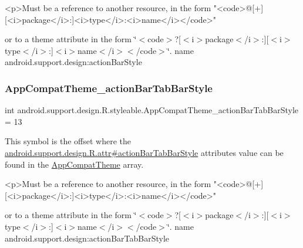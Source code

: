 \begin{DoxyVerb}      <p>Must be a reference to another resource, in the form "<code>@[+][<i>package</i>:]<i>type</i>:<i>name</i></code>"
\end{DoxyVerb}
 or to a theme attribute in the form \char`\"{}$<$code$>$?\mbox{[}$<$i$>$package$<$/i$>$\+:\mbox{]}\mbox{[}$<$i$>$type$<$/i$>$\+:\mbox{]}$<$i$>$name$<$/i$>$$<$/code$>$\char`\"{}.  name android.\+support.\+design\+:action\+Bar\+Style \mbox{\label{classandroid_1_1support_1_1design_1_1R_1_1styleable_ab0c563d507ebb2630a4566f31cf6f123}} 
\subsubsection{\texorpdfstring{App\+Compat\+Theme\+\_\+action\+Bar\+Tab\+Bar\+Style}{AppCompatTheme\_actionBarTabBarStyle}}
{\footnotesize\ttfamily int android.\+support.\+design.\+R.\+styleable.\+App\+Compat\+Theme\+\_\+action\+Bar\+Tab\+Bar\+Style = 13\hspace{0.3cm}{\ttfamily [static]}}

This symbol is the offset where the \hyperlink{classandroid_1_1support_1_1design_1_1R_1_1attr_a6ffaafec7b48bf979a12acf37ddeac31}{android.\+support.\+design.\+R.\+attr\#action\+Bar\+Tab\+Bar\+Style} attribute\textquotesingle{}s value can be found in the \hyperlink{classandroid_1_1support_1_1design_1_1R_1_1styleable_afb351dc8de20cbd4c89abe360373010c}{App\+Compat\+Theme} array.

\begin{DoxyVerb}      <p>Must be a reference to another resource, in the form "<code>@[+][<i>package</i>:]<i>type</i>:<i>name</i></code>"
\end{DoxyVerb}
 or to a theme attribute in the form \char`\"{}$<$code$>$?\mbox{[}$<$i$>$package$<$/i$>$\+:\mbox{]}\mbox{[}$<$i$>$type$<$/i$>$\+:\mbox{]}$<$i$>$name$<$/i$>$$<$/code$>$\char`\"{}.  name android.\+support.\+design\+:action\+Bar\+Tab\+Bar\+Style \mbox{\label{classandroid_1_1support_1_1design_1_1R_1_1styleable_a1347569d26ea3874ad7e4895dd851764}} 
